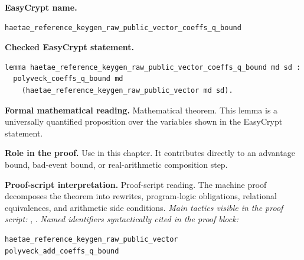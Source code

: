 \begin{formaltheorem}
\noindent\textbf{EasyCrypt name.}
\begin{lstlisting}[language=EasyCrypt,basicstyle=\ttfamily\scriptsize]
haetae_reference_keygen_raw_public_vector_coeffs_q_bound
\end{lstlisting}
\noindent\textbf{Checked EasyCrypt statement.}
\begin{lstlisting}[language=EasyCrypt,basicstyle=\ttfamily\scriptsize]
lemma haetae_reference_keygen_raw_public_vector_coeffs_q_bound md sd :
  polyveck_coeffs_q_bound md
    (haetae_reference_keygen_raw_public_vector md sd).
\end{lstlisting}
\noindent\textbf{Formal mathematical reading.}
Mathematical theorem. This lemma is a universally quantified proposition over the variables shown in the EasyCrypt statement.

\noindent\textbf{Role in the proof.}
Use in this chapter. It contributes directly to an advantage bound, bad-event bound, or real-arithmetic composition step.

\noindent\textbf{Proof-script interpretation.}
Proof-script reading. The machine proof decomposes the theorem into rewrites, program-logic obligations, relational equivalences, and arithmetic side conditions.
\emph{Main tactics visible in the proof script:} , .
\emph{Named identifiers syntactically cited in the proof block:}
\begin{lstlisting}[language=EasyCrypt,basicstyle=\ttfamily\scriptsize]
haetae_reference_keygen_raw_public_vector
polyveck_add_coeffs_q_bound
\end{lstlisting}

\end{formaltheorem}

